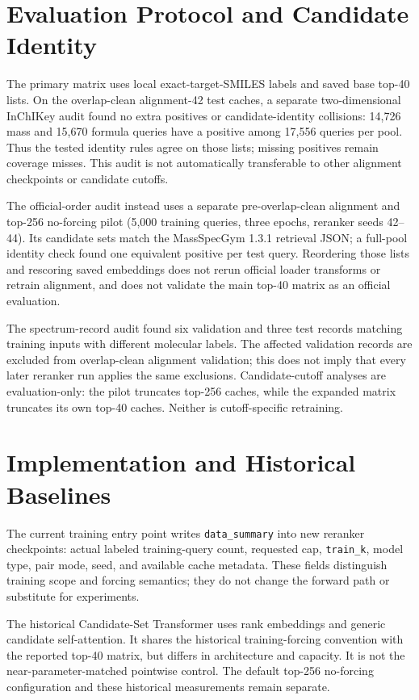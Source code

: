 \documentclass[runningheads]{llncs}
\begin{document}
\appendix

\section{Evaluation Protocol and Candidate Identity}

The primary matrix uses local exact-target-SMILES labels and saved base top-40
lists. On the overlap-clean alignment-42 test caches, a separate two-dimensional
InChIKey audit found no extra positives or candidate-identity collisions:
14,726 mass and 15,670 formula queries have a positive among 17,556 queries
per pool. Thus the tested identity rules agree on those lists; missing positives
remain coverage misses. This audit is not automatically transferable to other
alignment checkpoints or candidate cutoffs.

The official-order audit instead uses a separate pre-overlap-clean alignment
and top-256 no-forcing pilot (5,000 training queries, three epochs, reranker
seeds 42--44). Its candidate sets match the MassSpecGym 1.3.1 retrieval JSON;
a full-pool identity check found one equivalent positive per test query.
Reordering those lists and rescoring saved embeddings does not rerun official
loader transforms or retrain alignment, and does not validate the main top-40
matrix as an official evaluation.

The spectrum-record audit found six validation and three test records matching
training inputs with different molecular labels. The affected validation records
are excluded from overlap-clean alignment validation; this does not imply that
every later reranker run applies the same exclusions. Candidate-cutoff analyses
are evaluation-only: the pilot truncates top-256 caches, while the expanded
matrix truncates its own top-40 caches. Neither is cutoff-specific retraining.

\section{Implementation and Historical Baselines}

The current training entry point writes \texttt{data\_summary} into new
reranker checkpoints: actual labeled training-query count, requested cap,
\texttt{train\_k}, model type, pair mode, seed, and available cache metadata.
These fields distinguish training scope and forcing semantics; they do not
change the forward path or substitute for experiments.

The historical Candidate-Set Transformer uses rank embeddings and generic
candidate self-attention. It shares the historical training-forcing convention
with the reported top-40 matrix, but differs in architecture and capacity.
It is not the near-parameter-matched pointwise control. The default top-256
no-forcing configuration and these historical measurements remain separate.
\end{document}
